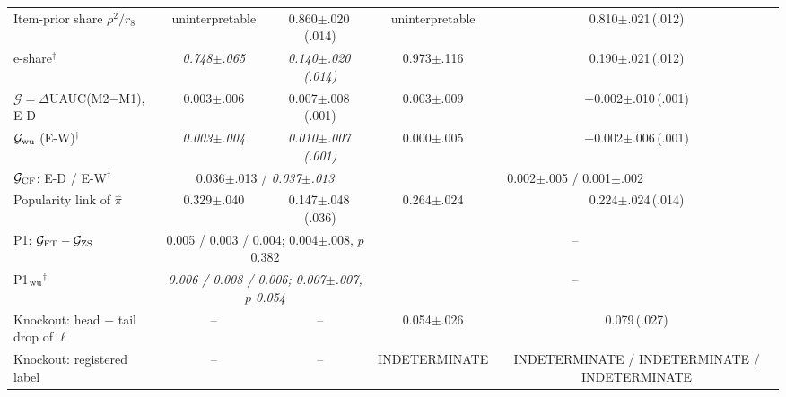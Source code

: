 \begin{table}[!htbp]
{\begin{tabular}{@{}lcccc@{}}
Item-prior share $\rho^2/r_8$ & uninterpretable & 0.860{\scriptsize$\pm$.020\,(.014)} & uninterpretable & 0.810{\scriptsize$\pm$.021\,(.012)}\\
e-share$^\dagger$ & \textit{0.748{\scriptsize$\pm$.065}} & \textit{0.140{\scriptsize$\pm$.020\,(.014)}} & 0.973{\scriptsize$\pm$.116} & 0.190{\scriptsize$\pm$.021\,(.012)}\\
$\mathcal G=\Delta$UAUC(M2$-$M1), E-D & 0.003{\scriptsize$\pm$.006} & 0.007{\scriptsize$\pm$.008\,(.001)} & 0.003{\scriptsize$\pm$.009} & $-$0.002{\scriptsize$\pm$.010\,(.001)}\\
$\mathcal G_{\rm wu}$ (E-W)$^\dagger$ & \textit{0.003{\scriptsize$\pm$.004}} & \textit{0.010{\scriptsize$\pm$.007\,(.001)}} & 0.000{\scriptsize$\pm$.005} & $-$0.002{\scriptsize$\pm$.006\,(.001)}\\
$\mathcal G_{\rm CF}$: E-D / E-W$^\dagger$ & \multicolumn{2}{c}{0.036{\scriptsize$\pm$.013} / \textit{0.037{\scriptsize$\pm$.013}}} & \multicolumn{2}{c}{0.002{\scriptsize$\pm$.005} / 0.001{\scriptsize$\pm$.002}}\\
Popularity link of $\hat\pi$ & 0.329{\scriptsize$\pm$.040} & 0.147{\scriptsize$\pm$.048\,(.036)} & 0.264{\scriptsize$\pm$.024} & 0.224{\scriptsize$\pm$.024\,(.014)}\\
P1: $\mathcal G_{\rm FT}-\mathcal G_{\rm ZS}$ & \multicolumn{2}{c}{0.005 / 0.003 / 0.004; 0.004{\scriptsize$\pm$.008}, $p$ 0.382} & \multicolumn{2}{c}{--}\\
P1$_{\rm wu}$$^\dagger$ & \multicolumn{2}{c}{\textit{0.006 / 0.008 / 0.006; 0.007{\scriptsize$\pm$.007}, $p$ 0.054}} & \multicolumn{2}{c}{--}\\
Knockout: head $-$ tail drop of $\ell$ & -- & -- & 0.054{\scriptsize$\pm$.026} & 0.079{\scriptsize\,(.027)}\\
Knockout: registered label & -- & -- & INDETERMINATE & INDETERMINATE / INDETERMINATE / INDETERMINATE\\
\bottomrule
\end{tabular}}
\end{table}

